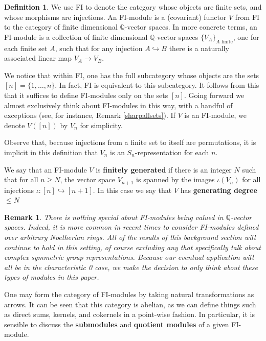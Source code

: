 \documentclass[12pt]{amsart}
\newtheorem{remark}[thm]{Remark}
\theoremstyle{definition}
\newtheorem{defn}[thm]{Definition}
\newcommand{\Q}{\mathbb{Q}}
\begin{document}
\begin{defn}
    We use FI to denote the category whose objects are finite sets, and whose morphisms are injections. An FI-module is a (covariant) functor $V$ from FI to the category of finite dimensional $\Q$-vector spaces. In more concrete terms, an FI-module is a collection of finite dimensional $\Q$-vector spaces $\{V_A\}_{A \text{ finite}}$, one for each finite set $A$, such that for any injection $A \hookrightarrow B$ there is a naturally associated linear map $V_A \rightarrow V_B$.

    We notice that within FI, one has the full subcategory whose objects are the sets $[n] = \{1,\ldots,n\}$. In fact, FI is equivalent to this subcategory. It follows from this that it suffices to define FI-modules only on the sets $[n]$. Going forward we almost exclusively think about FI-modules in this way, with a handful of exceptions (see, for instance, Remark \ref{sharpallsets}). If $V$ is an FI-module, we denote $V([n])$ by $V_n$ for simplicity.
    
    Observe that, because injections from a finite set to itself are permutations, it is implicit in this definition that $V_n$ is an $S_n$-representation for each $n$.

    We say that an FI-module $V$ is \textbf{finitely generated} if there is an integer $N$ such that for all $n \geq N$, the vector space $V_{n+1}$ is spanned by the images $\iota(V_n)$ for all injections $\iota:[n] \hookrightarrow [n+1]$. In this case we say that $V$ has \textbf{generating degree $\leq N$}
\end{defn}

\begin{remark}
    There is nothing special about FI-modules being valued in $\Q$-vector spaces. Indeed, it is more common in recent times to consider FI-modules defined over arbitrary Noetherian rings. All of the results of this background section will continue to hold in this setting, of course excluding any that specifically talk about complex symmetric group representations. Because our eventual application will all be in the characteristic 0 case, we make the decision to only think about these types of modules in this paper.
\end{remark}

One may form the category of FI-modules by taking natural transformations as arrows. It can be seen that this category is abelian, as we can define things such as direct sums, kernels, and cokernels in a point-wise fashion. In particular, it is sensible to discuss the \textbf{submodules} and \textbf{quotient modules} of a given FI-module.
\end{document}
